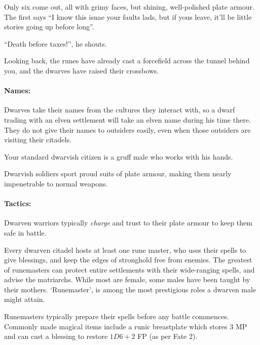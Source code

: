 \begin{multicols}{2}
\begin{boxtext}
  Only six come out, all with grimy faces, but shining, well-polished plate armour.
  The first says ``I know this isnae your faults lads, but if yous leave, it'll be little stories going up before long''.

  ``Death before taxes!'', he shouts.

  Looking back, the runes have already cast a forcefield across the tunnel behind you, and the dwarves have raised their crossbows.

\end{boxtext}

\paragraph{Names:}
Dwarves take their names from the cultures they interact with, so a dwarf trading with an elven settlement will take an elven name during his time there.
They do not give their names to outsiders easily, even when those outsiders are visiting their citadels.

\label{dwarven_trader}

Your standard dwarvish citizen is a gruff male who works with his hands.

\dwarventrader

\label{dwarven_soldier}

Dwarvish soldiers sport proud suits of plate armour, making them nearly impenetrable to normal weapons.


\paragraph{Tactics:} Dwarven  warriors typically \textit{charge} and trust to their plate armour to keep them safe in battle.%

\label{dwarven_runemaster}

Every dwarven citadel hosts at least one rune master, who uses their spells to give blessings, and keep the edges of stronghold free from enemies.
The greatest of runemasters can protect entire settlements with their wide-ranging spells, and advise the matriarchs.
While most are female, some males have been taught by their mothers.
`Runemaster', is among the most prestigious roles a dwarven male might attain.

\dwarvenrunemaster

Runemasters typically prepare their spells before any battle commences.
Commonly made magical items include a runic breastplate which stores 3 MP and can cast  a blessing to restore $1D6+2$ FP (as per Fate 2).


\end{multicols}
